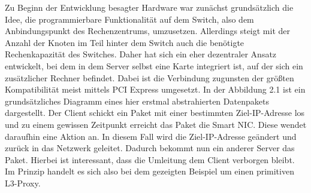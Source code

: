 Zu Beginn der Entwicklung besagter Hardware war zunächst grundsätzlich die Idee, die programmierbare Funktionalität auf dem Switch, also dem Anbindungspunkt des Rechenzentrums, umzusetzen. Allerdings steigt mit der Anzahl der Knoten im Teil hinter dem Switch auch die benötigte Rechenkapazität des Switches. Daher hat sich ein eher dezentraler Ansatz entwickelt, bei dem in dem Server selbst eine Karte integriert ist, auf der sich ein zusätzlicher Rechner befindet. Dabei ist die Verbindung zugunsten der größten Kompatibilität meist mittels PCI Express umgesetzt. In der Abbildung 2.1 ist ein grundsätzliches Diagramm eines hier erstmal abstrahierten Datenpakets dargestellt. Der Client schickt ein Paket mit einer bestimmten Ziel-IP-Adresse los und zu einem gewissen Zeitpunkt erreicht das Paket die Smart NIC. Diese wendet daraufhin eine Aktion an. In diesem Fall wird die Ziel-IP-Adresse geändert und zurück in das Netzwerk geleitet. Dadurch bekommt nun ein anderer Server das Paket. Hierbei ist interessant, dass die Umleitung dem Client verborgen bleibt. Im Prinzip handelt es sich also bei dem gezeigten Beispiel um einen primitiven L3-Proxy.
